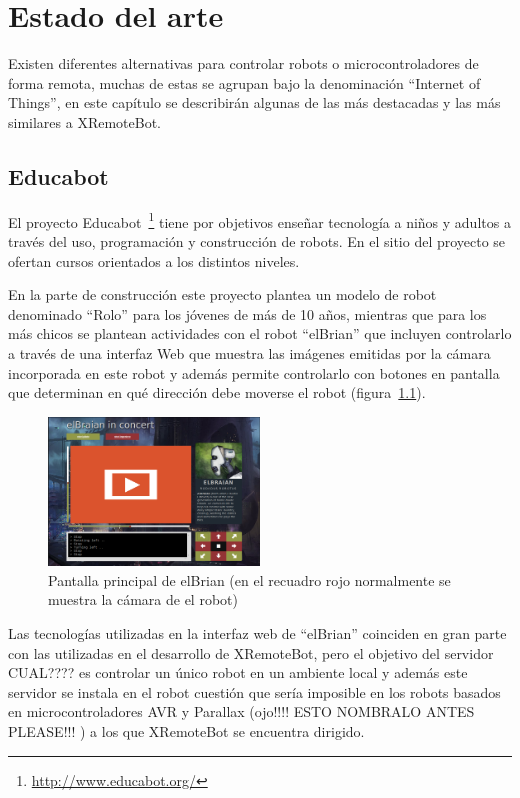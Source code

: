 \chapter{Estado del arte}
Existen diferentes alternativas para controlar robots o microcontroladores
de forma remota, muchas de estas se agrupan bajo la denominación
``Internet of Things'', en este capítulo se describirán algunas de las
más destacadas y las más similares a XRemoteBot.


\section{Educabot}
El proyecto Educabot~\footnote{\url{http://www.educabot.org/}} tiene por
objetivos enseñar tecnología a niños y adultos a través
del uso, programación y construcción de robots. En el sitio del proyecto
se ofertan cursos orientados a los distintos niveles.


En la parte de construcción este proyecto plantea un modelo de robot denominado
``Rolo'' para los jóvenes de más de 10 años, mientras que para los más chicos
se plantean actividades con el robot ``elBrian'' que incluyen
controlarlo a través de una interfaz Web que muestra las imágenes emitidas
por la cámara incorporada en este robot y además permite controlarlo con
botones en pantalla que determinan en qué dirección debe moverse el robot
(figura~\ref{fig:elbrian}).

\begin{figure}
    \centering
    \includegraphics[width=0.5\textwidth]{figures/elbrian-1}
    \caption{Pantalla principal de elBrian (en el recuadro rojo normalmente
        se muestra la cámara de el robot)}
    \label{fig:elbrian}
\end{figure}

Las tecnologías utilizadas en la interfaz web de ``elBrian'' coinciden en gran
parte con las utilizadas en el desarrollo de XRemoteBot, pero el objetivo del
servidor CUAL???? es controlar un único robot en un ambiente local y además este servidor
se instala en el robot cuestión que sería imposible en los robots basados en
microcontroladores AVR y Parallax (ojo!!!!  ESTO NOMBRALO ANTES PLEASE!!! ) a los que XRemoteBot se encuentra dirigido.


